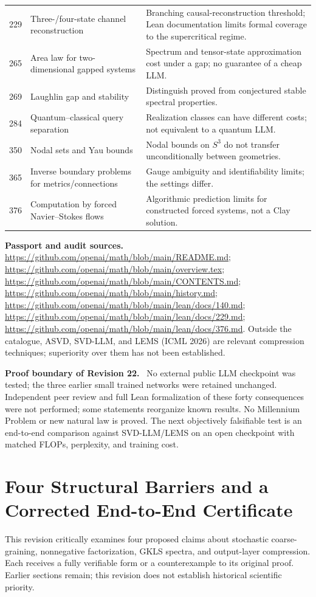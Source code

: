 \documentclass[11pt,a4paper,oneside]{book}
\newcommand{\note}[1]{\par\medskip\noindent\textbf{#1}\ }
\begin{document}
\begin{longtable}{@{}p{}p{}p{}@{}}
229&Three-/four-state channel reconstruction&Branching causal-reconstruction threshold; Lean documentation limits formal coverage to the supercritical regime.\\
265&Area law for two-dimensional gapped systems&Spectrum and tensor-state approximation cost under a gap; no guarantee of a cheap LLM.\\
269&Laughlin gap and stability&Distinguish proved from conjectured stable spectral properties.\\
284&Quantum--classical query separation&Realization classes can have different costs; not equivalent to a quantum LLM.\\
350&Nodal sets and Yau bounds&Nodal bounds on $S^3$ do not transfer unconditionally between geometries.\\
365&Inverse boundary problems for metrics/connections&Gauge ambiguity and identifiability limits; the settings differ.\\
376&Computation by forced Navier--Stokes flows&Algorithmic prediction limits for constructed forced systems, not a Clay solution.\\\bottomrule
\end{longtable}\normalsize
\note{Passport and audit sources.}
\url{https://github.com/openai/math/blob/main/README.md};
\url{https://github.com/openai/math/blob/main/overview.tex};
\url{https://github.com/openai/math/blob/main/CONTENTS.md};
\url{https://github.com/openai/math/blob/main/history.md};
\url{https://github.com/openai/math/blob/main/lean/docs/140.md};
\url{https://github.com/openai/math/blob/main/lean/docs/229.md};
\url{https://github.com/openai/math/blob/main/lean/docs/376.md}.
Outside the catalogue, ASVD, SVD-LLM, and LEMS (ICML 2026) are relevant compression techniques; superiority over them has not been established.
\note{Proof boundary of Revision 22.} No external public LLM checkpoint was tested; the three earlier small trained networks were retained unchanged. Independent peer review and full Lean formalization of these forty consequences were not performed; some statements reorganize known results. No Millennium Problem or new natural law is proved. The next objectively falsifiable test is an end-to-end comparison against SVD-LLM/LEMS on an open checkpoint with matched FLOPs, perplexity, and training cost.
\setcounter{equation}{106}
\chapter{Four Structural Barriers and a Corrected End-to-End Certificate}
This revision critically examines four proposed claims about stochastic coarse-graining, nonnegative factorization, GKLS spectra, and output-layer compression. Each receives a fully verifiable form or a counterexample to its original proof. Earlier sections remain; this revision does not establish historical scientific priority.
\end{document}

